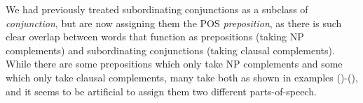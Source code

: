 
We had previously treated subordinating conjunctions as a subclass of
{\em conjunction}, but are now assigning them the POS {\em
preposition}, as there is such clear overlap between words that
function as prepositions (taking NP complements) and subordinating
conjunctions (taking clausal complements). While there are some
prepositions which only take NP complements and some which only take
clausal complements, many take both as shown in examples
()-(), and it seems to be artificial to assign them two
different parts-of-speech.


